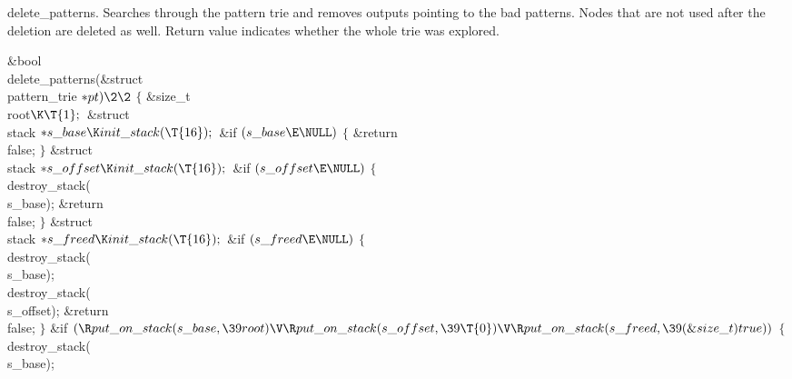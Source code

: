 delete\_patterns.
Searches through the pattern trie and removes outputs pointing to the bad
patterns. Nodes that are not used after the
deletion are deleted as well. Return value indicates whether the whole trie was
explored.

\Y\B\1\1\&{bool} \\{delete\_patterns}(\&{struct} \\{pattern\_trie} ${}{*}%
\\{pt})\2\2{}$\6
${}\{{}$\1\6
\&{size\_t} \\{root}${}\K\T{1};{}$\6
\&{struct} \\{stack} ${}{*}\\{s\_base}\K\\{init\_stack}(\T{16});{}$\7
\&{if} ${}(\\{s\_base}\E\NULL){}$\5
${}\{{}$\1\6
\&{return} \\{false};\6
\4${}\}{}$\2\7
\&{struct} \\{stack} ${}{*}\\{s\_offset}\K\\{init\_stack}(\T{16});{}$\7
\&{if} ${}(\\{s\_offset}\E\NULL){}$\5
${}\{{}$\1\6
\\{destroy\_stack}(\\{s\_base});\6
\&{return} \\{false};\6
\4${}\}{}$\2\7
\&{struct} \\{stack} ${}{*}\\{s\_freed}\K\\{init\_stack}(\T{16});{}$\7
\&{if} ${}(\\{s\_freed}\E\NULL){}$\5
${}\{{}$\1\6
\\{destroy\_stack}(\\{s\_base});\6
\\{destroy\_stack}(\\{s\_offset});\6
\&{return} \\{false};\6
\4${}\}{}$\2\6
\&{if} ${}(\R\\{put\_on\_stack}(\\{s\_base},\39\\{root})\V\R\\{put\_on\_stack}(%
\\{s\_offset},\39\T{0})\V\R\\{put\_on\_stack}(\\{s\_freed},\39(\&{size\_t})\,%
\\{true})){}$\5
${}\{{}$\1\6
\\{destroy\_stack}(\\{s\_base});\6
